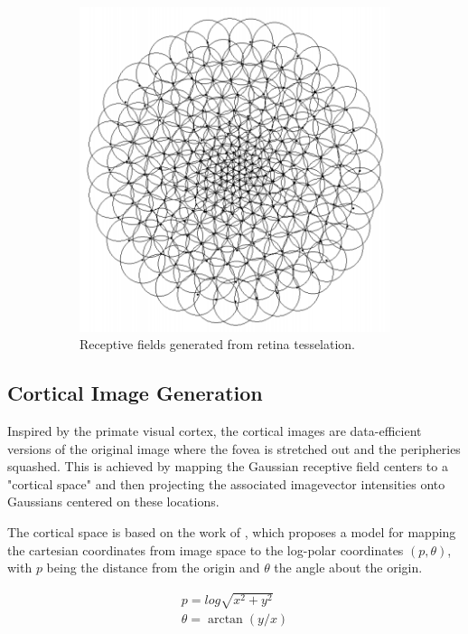 \documentclass{l4proj}
\begin{document}
\begin{figure}[H]
\begin{subfigure}[b]{0.49\textwidth}
    \includegraphics[width=\textwidth]{l4template-master/gaussian_rfs.png}
    \caption{Receptive fields generated from retina tesselation.}
    \label{gaussianrf}
  \end{subfigure} 
  \caption{}
  \label{retina}
 \end{figure}

\subsection{Cortical Image Generation}


Inspired by the primate visual cortex, the cortical images are data-efficient versions of the original image where the fovea is stretched out and the peripheries squashed. This is achieved by mapping the Gaussian receptive field centers to a "cortical space" and then projecting the associated imagevector intensities onto Gaussians centered on these locations. 

The cortical space is based on the work of \citet{Schwartz1977}, which proposes a model for mapping the cartesian coordinates from image space to the log-polar coordinates $(p,\theta)$, with $p$ being the distance from the origin and $\theta$ the angle about the origin.

\begin{align}
    p = log \sqrt{x^2 + y^2} \\ \nonumber
    \theta = \arctan(y/x)
\end{align}
\end{document}
